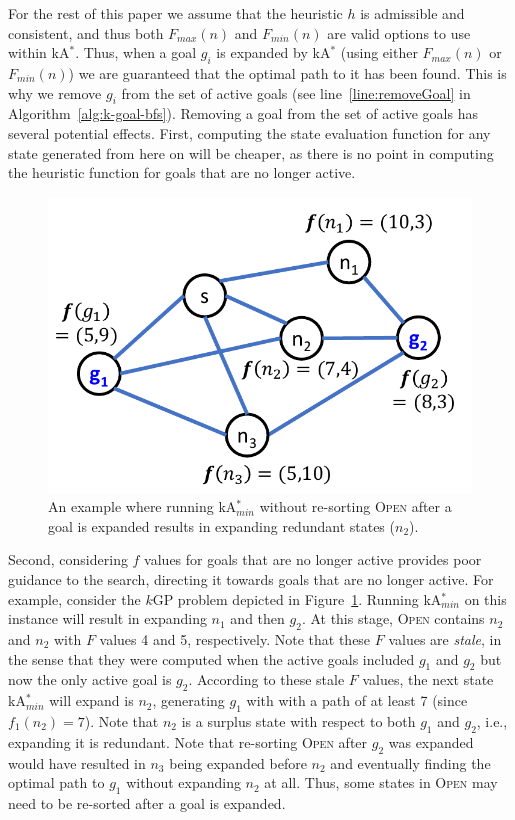 \documentclass{aicom2e}
\newcommand{\kgs}{$k$GP}
\newcommand{\kastar}{kA$^*$}
\newcommand{\kastarmin}{kA$^*_{min}$}
\newcommand{\minf}{$F_{min}(n)$}
\newcommand{\maxf}{$F_{max}(n)$}
\newcommand{\open}{\textsc{Open}}
\begin{document}
For the rest of this paper we assume that the heuristic $h$ is admissible and
consistent, and thus both \maxf{} and \minf{} are valid options to use within
\kastar{}. Thus, when a goal $g_i$ is
expanded by \kastar{} (using either \maxf{} or \minf{}) we are guaranteed that
the optimal path to it has been found. This is why we remove $g_i$ from the
set of active goals (see line~\ref{line:removeGoal} in
Algorithm~\ref{alg:k-goal-bfs}). Removing a goal from the set of active goals
has several potential effects. First, computing the state evaluation function for any state generated from here on will be cheaper, as there is no point in
computing the heuristic function for goals that are no longer active. 


\begin{figure}
	\includegraphics[width=0.7\columnwidth]{need-resort_cropped.pdf}
	\caption{An example where running \kastarmin{} without re-sorting \open{} after a goal is expanded
		results in expanding redundant states ($n_2$).}
	\label{fig:need-resort}
\end{figure}


Second, considering $f$ values for goals that are no longer active provides poor guidance to the search, directing it towards goals that are no longer active. For example, consider the \kgs{} problem depicted in Figure~\ref{fig:need-resort}. Running \kastarmin{} on this instance will result in expanding $n_1$ and then $g_2$. At this stage, \open{} contains $n_2$ and $n_2$ with $F$ values 4 and 5, respectively. 
Note that these $F$ values are {\em stale}, in the sense that they
were computed when the active goals included $g_1$ and $g_2$ 
but now the only active goal is $g_2$. 
According to these stale $F$ values, the next state \kastarmin{} 
will expand is $n_2$, generating $g_1$ with with a path of at least 7 
(since $f_1(n_2)=7$). Note that $n_2$ is a surplus state with respect to both $g_1$ and $g_2$, i.e., expanding it is redundant. Note that re-sorting \open{} after $g_2$ was expanded would have resulted in $n_3$ being expanded before $n_2$ and eventually finding the optimal path to $g_1$ without expanding $n_2$ at all. Thus, some states in \open{} may need to be re-sorted after a goal is expanded. 
\end{document}
